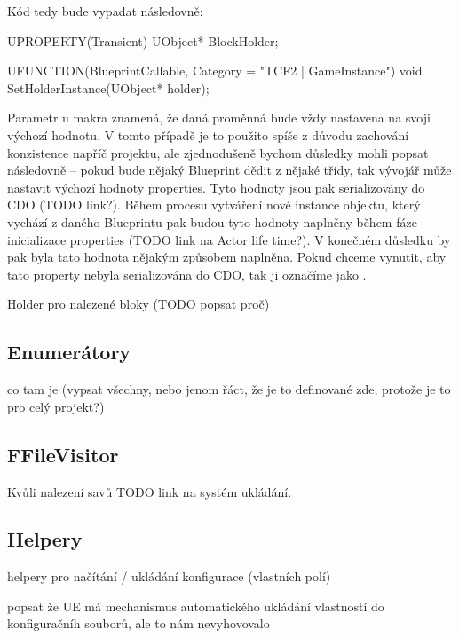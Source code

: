 Kód tedy bude vypadat následovně:
\begin{code}
	UPROPERTY(Transient)
		UObject* BlockHolder;

	UFUNCTION(BlueprintCallable, Category = "TCF2 | GameInstance")
		void SetHolderInstance(UObject* holder);
\end{code}
 Parametr  u makra  znamená, že daná proměnná bude vždy nastavena na svoji výchozí hodnotu. V tomto případě je to použito spíše z důvodu zachování konzistence napříč projektu, ale zjednodušeně bychom důsledky mohli popsat následovně -- pokud bude nějaký Blueprint dědit z nějaké \CPP{} třídy, tak vývojář může nastavit výchozí hodnoty properties. Tyto hodnoty jsou pak serializovány do CDO (TODO link?). Během procesu vytváření nové instance objektu, který vychází z daného Blueprintu pak budou tyto hodnoty naplněny během fáze inicializace properties (TODO link na Actor life time?). V konečném důsledku by pak byla tato hodnota nějakým způsobem naplněna. Pokud chceme vynutit, aby tato property nebyla serializována do CDO, tak ji označíme jako .

Holder pro nalezené bloky (TODO popsat proč)

\subsection{Enumerátory}


co tam je (vypsat všechny, nebo jenom řáct, že je to definované zde, protože je to pro celý projekt?)

\subsection{FFileVisitor}

Kvůli nalezení savů
TODO link na systém ukládání.

\subsection{Helpery}

helpery pro načítání / ukládání konfigurace (vlastních polí)

popsat že UE má mechanismus automatického ukládání vlastností do konfiguračníh souborů, ale to nám nevyhovovalo